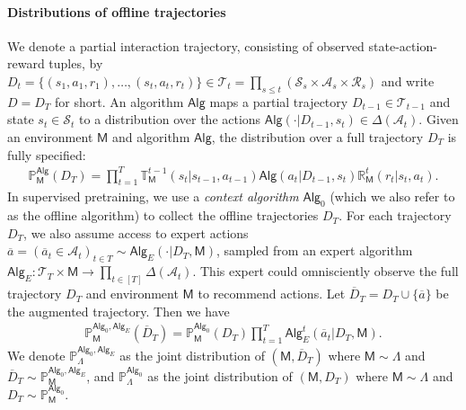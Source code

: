 \documentclass[10pt]{article}
\newcommand{\<}{\left\langle}
\renewcommand{\>}{\right\rangle}
\renewcommand{\P}{\mathbb{P}}
\newcommand{\inst}{{\mathsf{M}}}
\newcommand{\trajsp}{{\mathcal{T}}}
\newcommand{\widebar}[1]{\overline{#1}}
\newcommand{\transmodel}{{\mathbb T}}
\newcommand{\rewmodel}{{\mathbb R}}
\newcommand{\state}{{s}}
\newcommand{\action}{{a}}
\newcommand{\eaction}{{\widebar{a}}}
\newcommand{\reward}{{r}}
\newcommand{\totlen}{{T}}
\newcommand{\sAlg}{{\mathsf{Alg}}}
\newcommand{\dset}{{D}}
\newcommand{\adset}{{\widebar{D}}}
\newcommand{\prior}{{\Lambda}}
\newcommand{\statesp}{{\mathcal{S}}}
\newcommand{\actionsp}{{\mathcal{A}}}
\newcommand{\rewardsp}{{\mathcal{R}}}
\newcommand{\shortexp}{{E}}
\begin{document}
\paragraph{Distributions of offline trajectories} We denote a partial interaction trajectory, consisting of observed state-action-reward tuples, by $\dset_t=\{(\state_1,\action_1,\reward_1),\ldots,(\state_t,\action_t,\reward_t)\} \in \trajsp_t = \prod_{s \le t} (\statesp_s \times \actionsp_s \times \rewardsp_s)$ and write $\dset = \dset_{\totlen}$ for short. An algorithm $\sAlg$ maps a partial trajectory $\dset_{t-1} \in \trajsp_{t-1}$ and state $\state_t \in \statesp_t$ to a distribution over the actions $\sAlg(\cdot | \dset_{t-1}, \state_t) \in \Delta(\actionsp_t)$. Given an environment $\inst$ and algorithm $\sAlg$, the distribution over a full trajectory $\dset_\totlen$ is fully specified:
\begin{align*}
\textstyle \P_{\inst}^{\sAlg}(\dset_\totlen) =
\prod_{t=1}^{\totlen}\transmodel_{\inst}^{t-1}(\state_{t}|\state_{t-1},\action_{t-1}) \sAlg(\action_t|\dset_{t-1},\state_t)\rewmodel_{\inst}^t(\reward_t|\state_t,\action_t).
\end{align*}
In supervised pretraining, we use a \textit{context algorithm} $\sAlg_0$ (which we also refer to as the offline algorithm) to collect the offline trajectories $\dset_\totlen$. For each trajectory $\dset_\totlen$, we also assume access to expert actions $\eaction = ( \eaction_t \in \actionsp_t )_{t \in \totlen} \sim \sAlg_{\shortexp}(\cdot | \dset_\totlen, \inst)$, sampled from an expert algorithm $\sAlg_{\shortexp}: \trajsp_\totlen \times \inst \to \prod_{t \in [\totlen]} \Delta(\actionsp_t)$. This expert could omnisciently observe the full trajectory $\dset_\totlen$ and environment $\inst$ to recommend actions. Let $\adset_\totlen = \dset_\totlen \cup \{ \eaction \}$ be the augmented trajectory. Then we have
\begin{align*}
\textstyle \P^{\sAlg_0,\sAlg_{\shortexp}}_{\inst}(\adset_\totlen)=\P^{\sAlg_0}_{\inst}(\dset_\totlen)\prod_{t=1}^\totlen \sAlg_{\shortexp}^t (\eaction_t|\dset_{\totlen},\inst).
\end{align*}
We denote $\P^{\sAlg_0,\sAlg_\shortexp}_{\prior}$ as the joint distribution of $(\inst,\adset_\totlen)$ where $\inst \sim \prior$ and $\adset_\totlen \sim \P^{\sAlg_0,\sAlg_\shortexp}_{\inst}$, and $\P^{\sAlg_0}_{\prior}$ as the joint distribution of $(\inst,\dset_\totlen)$ where $\inst \sim \prior$ and $\dset_\totlen \sim \P^{\sAlg_0}_{\inst}$.
\end{document}
